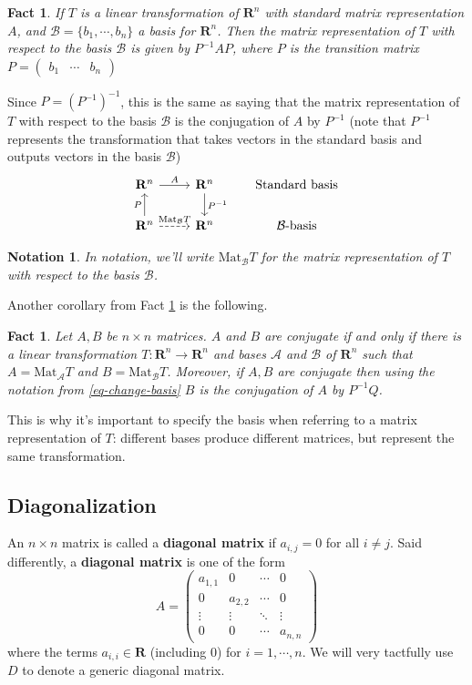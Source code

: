 \documentclass[12pt]{article}
\numberwithin{equation}{subsection}
\numberwithin{figure}{subsection}
\newtheorem{fact}[subsection]{Fact}
\theoremstyle{note}
\newtheorem{notation}[subsection]{Notation}
\newcommand{\R}{\mathbf{R}}
\newcommand\Mat{\mathrm{Mat}}
\begin{document}
\begin{fact} \label{fact-conj} If $T$ is a linear transformation of $\R^n$ with standard matrix representation $A$, and $\mathcal{B}=\{b_1,\cdots,b_n\}$ a basis for $\mathbf{R}^n$. Then the matrix representation of $T$ with respect to the basis $\mathcal{B}$ is given by $P^{-1}AP$, where $P$ is the transition matrix $P=\begin{pmatrix} b_1  & \cdots & b_n\end{pmatrix} $
\end{fact}
Since $P=(P^{-1})^{-1}$, this is the same as saying that the matrix representation of $T$ with respect to the basis $\mathcal{B}$ is the conjugation of $A$ by $P^{-1}$ (note that $P^{-1}$ represents the transformation that takes vectors in the standard basis and outputs vectors in the basis $\mathcal{B}$)
\begin{equation}
\begin{tikzcd}
\R^n \arrow{r}{A}&  \R^n \arrow{d}{P^{-1}} & \text{Standard basis} \\
\R^n \arrow{u}{P} \arrow[dashed]{r}{\Mat_{\mathcal{B}}T} & \R^n & \text{$\mathcal{B}$-basis}
\end{tikzcd} 
\end{equation}

\begin{notation}
In notation, we'll write $\Mat_{\mathcal{B}}T$ for the matrix representation of $T$ with respect to the basis $\mathcal{B}$. 
\end{notation}
Another corollary from Fact \ref{fact-conj} is the following.

\begin{fact}Let $A,B$ be $n\times n$ matrices.  $A$ and $B$ are conjugate if and only if there is a linear transformation $T\colon\R^n\to\R^n$ and bases $\mathcal{A}$ and $\mathcal{B}$ of $\R^n$ such that $A=\Mat_{\mathcal{A}}T$ and $B=\Mat_{\mathcal{B}}T$. Moreover, if $A,B$ are conjugate then using the notation from \eqref{eq-change-basis} $B$ is the conjugation of $A$ by $P^{-1}Q$.
\end{fact}

This is why it's important to specify the basis when referring to a matrix representation of $T$: different bases produce different matrices, but represent the same transformation.
\subsection{Diagonalization}

An $n\times n$ matrix is called a \textbf{diagonal matrix} if $a_{i,j}=0$ for all $i\neq j$. Said differently, a \textbf{diagonal matrix} is one of the form 
\begin{equation}  A=\begin{pmatrix} a_{1,1} & 0 &  \cdots & 0 \\
0 & a_{2,2} & \cdots & 0 \\
\vdots &  \vdots & \ddots & \vdots \\
0 & 0 &  \cdots & a_{n,n} \end{pmatrix}\end{equation}
where the terms $a_{i,i}\in\R$ (including $0$) for $i=1,\cdots,n$. We will very tactfully use $D$ to denote a generic diagonal matrix. 
\end{document}
